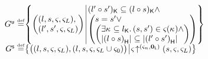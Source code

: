 \begin{definition}[Guarantee]
\[\begin{array}{@{} r @{} l @{}}
	\updateG \eqdef &
 	\left\{
	\begin{array}{@{} l @{\hspace*{2pt}} | @{\hspace*{2pt}} r @{}}
	   	\left(
	   	\begin{array}{@{} l @{}}
	     	(l, s, \amod{}, \amod{L}),\\
	     	(l', s', \amod{}, \amod{L})
	   	\end{array}
		\right)
	  	&
	  	\begin{array}{@{} l @{} }
	  		\capPart{(l' \composeL s')}  \subseteq \capPart{(l \composeL s)} \land\\
		  	\left(
		  	\begin{array}{@{} l @{} }
		 		s = s' \lor\\
		 	  	\left(
		 	  	\begin{array}{@{} l @{}}
		 	  		\exsts{\ca{} \subseteq \capPart{l}}
		 	  		(s, s') \in \amod{}(\ca{}) \land\\
		 	  	
		 	  	\heapSize{\heapPart{\left(l \composeL s\right)}} \subseteq 
		 	  	\heapSize{\heapPart{\left(l' \composeL s'\right)}}
		 	  	\end{array}	
		 	  	\right)
		 	\end{array}
	   		\right)
   		\end{array}
 	\end{array}
	\right\}\\
	
	
	
	\shiftG \eqdef & 
	\left\{
	\begin{array}{@{} l @{\hspace*{2pt}} | @{\hspace*{2pt}} r @{}}
	   \left(
	   \begin{array}{@{} l @{}}
	     (l, s, \amod{}, \amod{L}),
 	     \left( l, s, \amod{}, \amod{L} \cup \amod{0}  \right)
	   \end{array}
 	  \right)
	   &
	   
	   \expandsAM{\amod{}}{\amod{n}}{\unitL}{s}{\amod{}}{\amod{L}}
 	\end{array}
	\right\}

\end{array}
\]
%
\end{definition}
